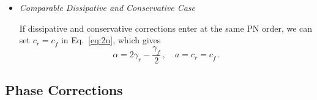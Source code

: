 \documentclass[prd,twocolumn,nofootinbib]{revtex4-1}
\begin{document}
\begin{itemize}

\item
\emph{Comparable Dissipative and Conservative Case}

If dissipative and conservative corrections enter at the same PN order, we can set $c_r=c_{\dot{f}}$ in Eq.~\eqref{eq:2n}, which gives 
\begin{equation}
\label{eq:amp-ppE-comparable}
\alpha=2 \text{$\gamma_r $}-\frac{\text{$\gamma_{\dot{f}} $}}{2}\,, \quad a=c_{r}=c_{\dot{f}}\,.
\end{equation}

\end{itemize}

\subsection{Phase Corrections}
\end{document}
